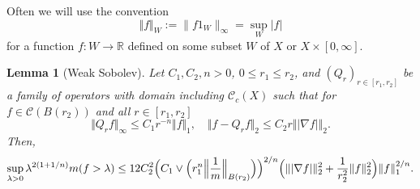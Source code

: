 \documentclass[JEP,XML,SOM,Unicode,published]{cedram}
\theoremstyle{plain}
\newtheorem{lemma}[theorem]{Lemma}
\theoremstyle{definition}
\newcommand{\RR}{\mathbb{R}}
\newcommand{\cC}{\mathcal{C}}
\begin{document}
Often we will use the convention
\[
\Vert f\Vert_W:={\|f1_{W}\|_{\infty}=}\sup_W\vert f\vert
\]
for a function $f\colon W\to \RR$ defined on some subset $ W $ of $ X $ or $ X\times [0,\infty]$.
\begin{lemma}[Weak Sobolev]\label{lem:weakS}Let $C_1,C_2,n>0$, $0\leq r_1\leq r_2$,
and $(Q_{r})_{r\in[r_1, r_2]}$ be a family of operators with domain including $\cC_c(X)$ such that for $f\in\cC( B(r_2))$ and all $r\in [ r_1, r_2]$
\[
\Vert Q_{r}f\Vert_\infty\leq C_1 r^{-n}\Vert f\Vert_1, \quad \Vert f-Q_{r}f\Vert_2\leq C_2 r\Vert |\nabla f|\Vert_2.
\]
Then,
\[
\sup_{\lambda>0}\lambda^{2(1+1/n)}m(f>\lambda)
\leq 12 C_2^2
\Bigl(C_1\vee \Bigl(r_1^n \Bigl\Vert\frac1m\Bigr\Vert_{B(r_2)}\Bigr)\Bigr)^{{2}/{n}}
\Bigl( \Vert|\nabla f|\Vert_2^2+\frac{1}{r_2^2}\Vert f\Vert_2^2\Bigr)\Vert f\Vert_1^{2/n}.
\]
\end{lemma}
\end{document}
